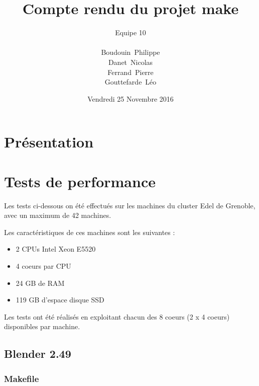 \documentclass[a4paper, 11pt, titlepage]{article}
\title {{ {\huge Compte rendu du projet make }} }
\author{\Large Equipe 10 \\
\\
    {\sc Boudouin}~Philippe\\
    {\sc Danet}~Nicolas\\
    {\sc Ferrand}~Pierre\\
    {\sc Gouttefarde}~Léo
}
\date{Vendredi 25 Novembre 2016}
\begin{document}
\pagestyle{fancy}
\maketitle

\setcounter{tocdepth}{2}

\tableofcontents
\newpage

\section {Présentation}




\newpage

\section {Tests de performance}

Les tests ci-dessous on été effectués sur les machines du cluster Edel de Grenoble, avec un maximum de 42 machines.

Les caractéristiques de ces machines sont les suivantes :

\begin{itemize}

\item
2 CPUs Intel Xeon E5520

\item
4 coeurs par CPU

\item
24 GB de RAM

\item
119 GB d'espace disque SSD

\end{itemize}



Les tests ont été réalisés en exploitant chacun des 8 coeurs (2 x 4 coeurs) disponibles par machine.


\subsection {Blender 2.49}
\subsubsection {Makefile}


\end{document}
